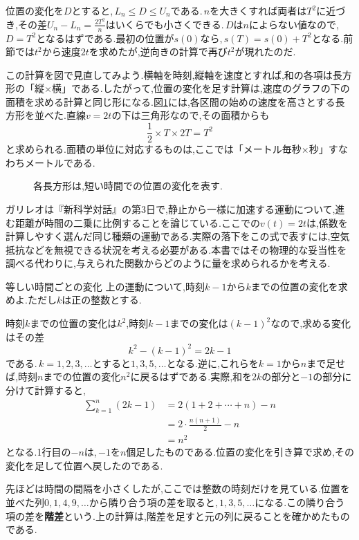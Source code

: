 位置の変化を$D$とすると,\,$L_n\le D\le U_n$である.\,$n$を大きくすれば両者は$T^2$に近づき,その差$U_n-L_n=\frac{2T^2}{n}$はいくらでも小さくできる.\,$D$は$n$によらない値なので,\,$D=T^2$となるはずである.最初の位置が$s(0)$なら,\,$s(T)=s(0)+T^2$となる.前節では$t^2$から速度$2t$を求めたが,逆向きの計算で再び$t^2$が現れたのだ.

この計算を図で見直してみよう.横軸を時刻,縦軸を速度とすれば,和の各項は長方形の「縦$\times$横」である.したがって,位置の変化を足す計算は,速度のグラフの下の面積を求める計算と同じ形になる.図\ref{図:速度の長方形}には,各区間の始めの速度を高さとする長方形を並べた.直線$v=2t$の下は三角形なので,その面積からも
\[
 \frac12\times T\times2T=T^2
\]
と求められる.面積の単位に対応するものは,ここでは「メートル毎秒$\times$秒」すなわちメートルである.

\begin{figure}[htbp]
\centering
{}
\caption{各長方形は,短い時間での位置の変化を表す.}\label{図:速度の長方形}
\end{figure}

ガリレオは『新科学対話』の第3日で,静止から一様に加速する運動について,進む距離が時間の二乗に比例することを論じている.ここでの$v(t)=2t$は,係数を計算しやすく選んだ同じ種類の運動である.実際の落下をこの式で表すには,空気抵抗などを無視できる状況を考える必要がある.本書ではその物理的な妥当性を調べる代わりに,与えられた関数からどのように量を求められるかを考える.

\begin{example}{等しい時間ごとの変化}
上の運動について,時刻$k-1$から$k$までの位置の変化を求めよ.ただし$k$は正の整数とする.
\end{example}
時刻$k$までの位置の変化は$k^2$,時刻$k-1$までの変化は$(k-1)^2$なので,求める変化はその差
\[
 k^2-(k-1)^2=2k-1
\]
である.\,$k=1,2,3,\ldots$とすると$1,3,5,\ldots$となる.逆に,これらを$k=1$から$n$まで足せば,時刻$n$までの位置の変化$n^2$に戻るはずである.実際,和を$2k$の部分と$-1$の部分に分けて計算すると,
\begin{align*}
 \sum_{k=1}^{n}(2k-1)
 &=2(1+2+\cdots+n)-n\\
 &=2\cdot\frac{n(n+1)}2-n\\
 &=n^2
\end{align*}
となる.1行目の$-n$は,\,$-1$を$n$個足したものである.位置の変化を引き算で求め,その変化を足して位置へ戻したのである.

先ほどは時間の間隔を小さくしたが,ここでは整数の時刻だけを見ている.位置を並べた列$0,1,4,9,\ldots$から隣り合う項の差を取ると,\,$1,3,5,\ldots$になる.この隣り合う項の差を\textbf{階差}という.上の計算は,階差を足すと元の列に戻ることを確かめたものである.
